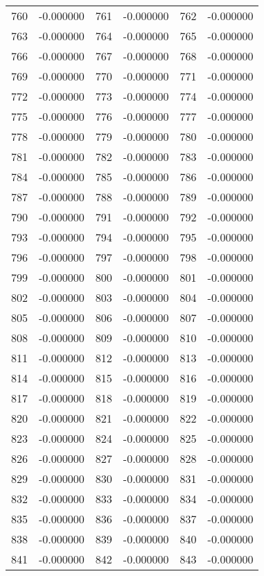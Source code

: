 \documentclass[12pt]{article}
\begin{document}
\begin{longtable}{@{}cc|cc|cc@{}}
760 & -0.000000 & 761 & -0.000000 & 762 & -0.000000 \\
763 & -0.000000 & 764 & -0.000000 & 765 & -0.000000 \\
766 & -0.000000 & 767 & -0.000000 & 768 & -0.000000 \\
769 & -0.000000 & 770 & -0.000000 & 771 & -0.000000 \\
772 & -0.000000 & 773 & -0.000000 & 774 & -0.000000 \\
775 & -0.000000 & 776 & -0.000000 & 777 & -0.000000 \\
778 & -0.000000 & 779 & -0.000000 & 780 & -0.000000 \\
781 & -0.000000 & 782 & -0.000000 & 783 & -0.000000 \\
784 & -0.000000 & 785 & -0.000000 & 786 & -0.000000 \\
787 & -0.000000 & 788 & -0.000000 & 789 & -0.000000 \\
790 & -0.000000 & 791 & -0.000000 & 792 & -0.000000 \\
793 & -0.000000 & 794 & -0.000000 & 795 & -0.000000 \\
796 & -0.000000 & 797 & -0.000000 & 798 & -0.000000 \\
799 & -0.000000 & 800 & -0.000000 & 801 & -0.000000 \\
802 & -0.000000 & 803 & -0.000000 & 804 & -0.000000 \\
805 & -0.000000 & 806 & -0.000000 & 807 & -0.000000 \\
808 & -0.000000 & 809 & -0.000000 & 810 & -0.000000 \\
811 & -0.000000 & 812 & -0.000000 & 813 & -0.000000 \\
814 & -0.000000 & 815 & -0.000000 & 816 & -0.000000 \\
817 & -0.000000 & 818 & -0.000000 & 819 & -0.000000 \\
820 & -0.000000 & 821 & -0.000000 & 822 & -0.000000 \\
823 & -0.000000 & 824 & -0.000000 & 825 & -0.000000 \\
826 & -0.000000 & 827 & -0.000000 & 828 & -0.000000 \\
829 & -0.000000 & 830 & -0.000000 & 831 & -0.000000 \\
832 & -0.000000 & 833 & -0.000000 & 834 & -0.000000 \\
835 & -0.000000 & 836 & -0.000000 & 837 & -0.000000 \\
838 & -0.000000 & 839 & -0.000000 & 840 & -0.000000 \\
841 & -0.000000 & 842 & -0.000000 & 843 & -0.000000 \\

\end{longtable}
\end{document}
